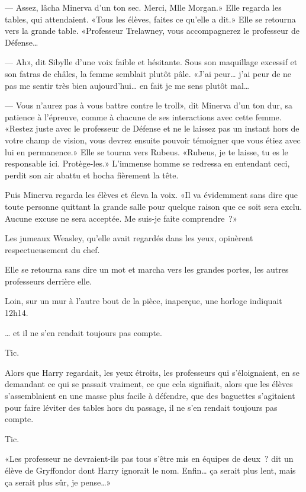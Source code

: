 --- Assez, lâcha Minerva d'un ton sec. Merci, Mlle Morgan.» Elle regarda les tables, qui attendaient. «Tous les élèves, faites ce qu'elle a dit.» Elle se retourna vers la grande table. «Professeur Trelawney, vous accompagnerez le professeur de Défense…

--- Ah», dit Sibylle d'une voix faible et hésitante. Sous son maquillage excessif et son fatras de châles, la femme semblait plutôt pâle. «J'ai peur… j'ai peur de ne pas me sentir très bien aujourd'hui… en fait je me sens plutôt mal…

--- Vous n'aurez pas à vous battre contre le troll», dit Minerva d'un ton dur, sa patience à l'épreuve, comme à chacune de ses interactions avec cette femme. «Restez juste avec le professeur de Défense et ne le laissez pas un instant hors de votre champ de vision, vous devrez ensuite pouvoir témoigner que vous étiez avec lui en permanence.» Elle se tourna vers Rubeus. «Rubeus, je te laisse, tu es le responsable ici. Protège-les.» L'immense homme se redressa en entendant ceci, perdit son air abattu et hocha fièrement la tête.

Puis Minerva regarda les élèves et éleva la voix. «Il va évidemment sans dire que toute personne quittant la grande salle pour quelque raison que ce soit sera exclu. Aucune excuse ne sera acceptée. Me suis-je faite comprendre~?»

Les jumeaux Weasley, qu'elle avait regardés dans les yeux, opinèrent respectueusement du chef.

Elle se retourna sans dire un mot et marcha vers les grandes portes, les autres professeurs derrière elle.

Loin, sur un mur à l'autre bout de la pièce, inaperçue, une horloge indiquait 12h14.

… et il ne s'en rendait toujours pas compte.

Tic.

Alors que Harry regardait, les yeux étroits, les professeurs qui s'éloignaient, en se demandant ce qui se passait vraiment, ce que cela signifiait, alors que les élèves s'assemblaient en une masse plus facile à défendre, que des baguettes s'agitaient pour faire léviter des tables hors du passage, il ne s'en rendait toujours pas compte.

Tic.

«Les professeur ne devraient-ils pas tous s'être mis en équipes de deux~? dit un élève de Gryffondor dont Harry ignorait le nom. Enfin… ça serait plus lent, mais ça serait plus sûr, je pense…»

